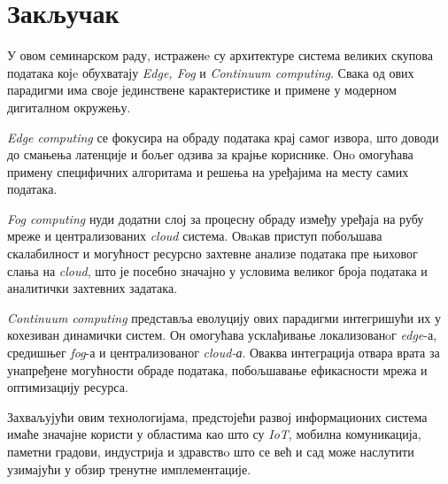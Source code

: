 \section{Закључак}
 
У овом семинарском раду, истраженe су архитектуре система великих скупова података којe обухватају \textit{Edge, Fog} и \textit{Continuum computing}. Свака од ових парадигми има своје јединствене карактеристике и примене у модерном дигиталном окружењу.

\textit{Edge computing} се фокусира на обраду података крај самог извора, што доводи до смањења латенције и бољег одзива за крајње кориснике. Онo омогућава примену специфичних алгоритама и решења на уређајима на месту самих података.

\textit{Fog computing} нуди додатни слој за процесну обраду између уређаја на рубу мреже и централизованих \textit{cloud} система. Овaкав приступ побољшава скалабилност и могућност ресурсно захтевне анализе података пре њиховог слања на \textit{cloud}, што је посебно значајно у условима великог броја података и аналитички захтевних задатака.

\textit{Continuum computing} представља еволуцију ових парадигми интегришући их у кохезиван динамички систем. Он омогућава усклађивање локализованoг \textit{edge}-а, средишњег \textit{fog}-а и централизованог \textit{cloud-а}. Оваква интеграција отвара врата за унапређене могућности обраде података, побољшавање ефикасности мрежа и оптимизацију ресурса.

Захваљујући овим технологијама, предстојећи развој информационих система имаће значајне користи у областима као што су \textit{IoT}, мобилна комуникација, паметни градови, индустрија и здравствo што се већ и сад може наслутити узимајући у обзир тренутне имплементације.